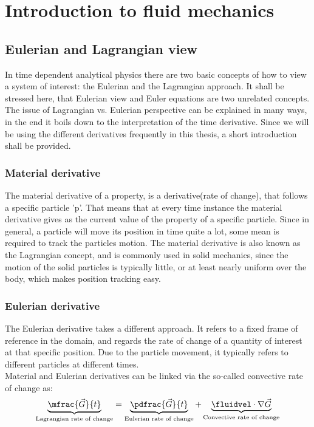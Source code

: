 \documentclass[../main.tex]{subfiles}
\begin{document}
\setlength{\delimitershortfall}{0pt}

\chapter{Introduction to fluid mechanics}\label{sec:fluid_mechanics}
\minitoc

\section{Eulerian and Lagrangian view}\label{sec:eulerian_lagrangian}
In time dependent analytical physics there are two basic concepts of how to view a system of interest: the Eulerian and the Lagrangian approach. It shall be stressed here, that Eulerian view and Euler equations are two unrelated concepts.\\
The issue of Lagrangian vs. Eulerian perspective can be explained in many ways, in the end it boils down to the interpretation of the time derivative. Since we will be using the different derivatives frequently in this thesis, a short introduction shall be provided.
\subsection{Material derivative}
The material derivative of a property, is a derivative(rate of change), that follows a specific particle 'p'. That means that at every time instance the material derivative gives as the current value of the property of a specific particle. Since in general, a particle will move its position in time quite a lot, some mean is required to track the particles motion. The material derivative is also known as the Lagrangian concept, and is commonly used in solid mechanics, since the motion of the solid particles is typically little, or at least nearly uniform over the body, which makes position tracking easy.

\subsection{Eulerian derivative}
The Eulerian derivative takes a different approach. It refers to a fixed frame of reference in the domain, and regards the rate of change of a quantity of interest at that specific position. Due to the particle movement, it typically refers to different particles at different times.
\\
Material and Eulerian derivatives can be linked via the so-called convective rate of change as:
\begin{align}
\underbrace{\mfrac{\vec{G}}{t}}_{\text{Lagrangian rate of change}} = \underbrace{\pdfrac{\vec{G}}{t}}_{\text{Eulerian rate of change}} + \underbrace{\fluidvel\cdot\nabla\vec{G}}_{\text{Convective rate of change}}
\end{align}
\end{document}
